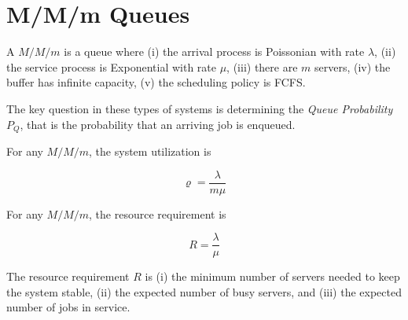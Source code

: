 \section{M/M/m Queues}
\label{sec:M-M-m-Queues}

A $M/M/m$ is a queue where 
(i) the arrival process is Poissonian with rate $\lambda$,
(ii) the service process is Exponential with rate $\mu$,
(iii) there are $m$ servers,
(iv) the buffer has infinite capacity,
(v) the scheduling policy is FCFS.


The key question in these types of systems is determining the \textit{Queue Probability} $P_{Q}$, that is the probability that an arriving job is enqueued.

\begin{definition}[Utilization]
\label{def:M-M-m-Utilization}
	For any $M/M/m$, the system utilization is
	
	\begin{equation}
	\label{eqn:M-M-m-Utilization}
	\varrho = \frac{\lambda}{m \mu}
	\end{equation}
\end{definition}

\begin{definition}
\label{def:M-M-m-Resource-Requirement}
	For any $M/M/m$, the resource requirement is
	
	\begin{equation}
	\label{eqn:M-M-m-Resource-Requirement}	
	R = \frac{\lambda}{\mu}
	\end{equation}
\end{definition}

The resource requirement $R$ is 
(i) the minimum number of servers needed to keep the system stable,
(ii) the expected number of busy servers, and 
(iii) the expected number of jobs in service.
	
